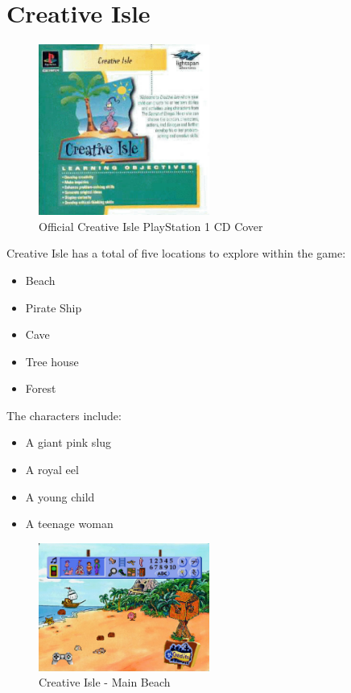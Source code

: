 \chapter{Creative Isle}

\begin{figure}[H]
    \centering
    \includegraphics[width=0.5\textwidth]{"./Games/Creative/Images/CreativeIsleCDCover.jpg"}
    \caption{Official Creative Isle PlayStation 1 CD Cover}
\end{figure}

Creative Isle has a total of five locations to explore within the game:

\begin{itemize}
    \item Beach
    \item Pirate Ship
    \item Cave
    \item Tree house
    \item Forest
\end{itemize}

The characters include:
\begin{itemize}
    \item A giant pink slug
    \item A royal eel
    \item A young child
    \item A teenage woman
\end{itemize}

\begin{figure}[H]
    \centering
    \includegraphics[width=0.5\textwidth]{"./Games/Creative/Images/CreativeIsleScreenshot1.jpg"}
    \caption{Creative Isle - Main Beach}
\end{figure}

